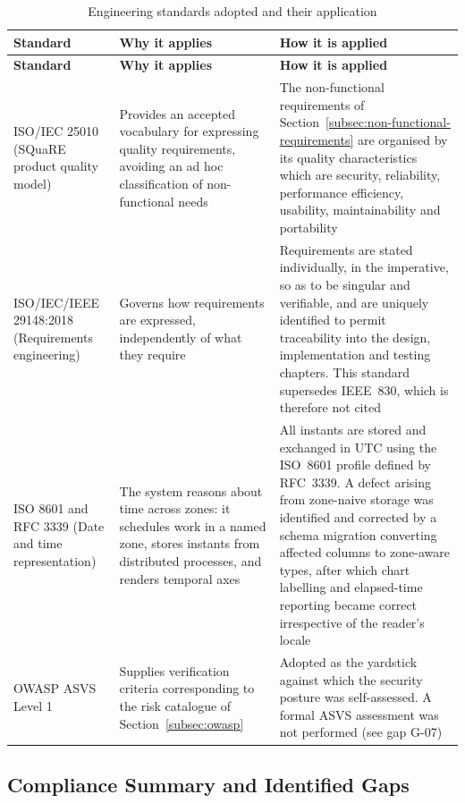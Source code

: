 \begin{longtable}{
  >{\raggedright\arraybackslash}p{}
  >{\raggedright\arraybackslash}p{}
  >{\raggedright\arraybackslash}p{}
}
\caption{Engineering standards adopted and their application}
\label{tab:engineering-standards}\\
\toprule
\textbf{Standard} & \textbf{Why it applies} & \textbf{How it is applied} \\
\midrule
\endfirsthead
\toprule
\textbf{Standard} & \textbf{Why it applies} & \textbf{How it is applied} \\
\midrule
\endhead
\bottomrule
\endlastfoot
ISO/IEC 25010 (SQuaRE product quality model) & Provides an accepted vocabulary for
expressing quality requirements, avoiding an ad hoc classification of non-functional
needs & The non-functional requirements of
Section~\ref{subsec:non-functional-requirements} are organised by its quality
characteristics which are security, reliability, performance efficiency, usability,
maintainability and portability \\
\addlinespace
ISO/IEC/IEEE 29148:2018 (Requirements engineering) & Governs how requirements are
expressed, independently of what they require & Requirements are stated individually,
in the imperative, so as to be singular and verifiable, and are uniquely identified
to permit traceability into the design, implementation and testing chapters. This
standard supersedes IEEE~830, which is therefore not cited \\
\addlinespace
ISO 8601 and RFC 3339 (Date and time representation) & The system reasons about time
across zones: it schedules work in a named zone, stores instants from distributed
processes, and renders temporal axes & All instants are stored and exchanged in UTC
using the ISO~8601 profile defined by RFC~3339. A defect arising from zone-naive
storage was identified and corrected by a schema migration converting affected
columns to zone-aware types, after which chart labelling and elapsed-time reporting
became correct irrespective of the reader's locale \\
\addlinespace
OWASP ASVS Level 1 & Supplies verification criteria corresponding to the risk
catalogue of Section~\ref{subsec:owasp} & Adopted as the yardstick against which the
security posture was self-assessed. A formal ASVS assessment was not performed
(see gap G-07) \\
\end{longtable}

\subsection{Compliance Summary and Identified Gaps}
\label{subsec:compliance-summary}

